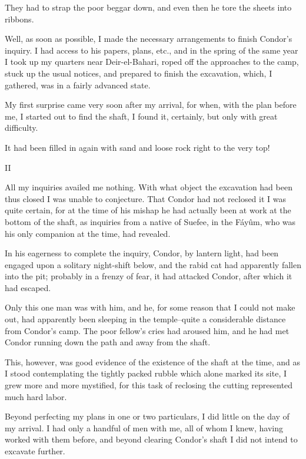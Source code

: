 They had to strap the poor beggar down, and even then he tore the
sheets into ribbons.

Well, as soon as possible, I made the necessary arrangements to finish
Condor's inquiry. I had access to his papers, plans, etc., and in the
spring of the same year I took up my quarters near Deir-el-Bahari,
roped off the approaches to the camp, stuck up the usual notices, and
prepared to finish the excavation, which, I gathered, was in a fairly
advanced state.

My first surprise came very soon after my arrival, for when, with the
plan before me, I started out to find the shaft, I found it,
certainly, but only with great difficulty.

It had been filled in again with sand and loose rock right to the very
top!


II

All my inquiries availed me nothing. With what object the excavation
had been thus closed I was unable to conjecture. That Condor had not
reclosed it I was quite certain, for at the time of his mishap he had
actually been at work at the bottom of the shaft, as inquiries from a
native of Suefee, in the Fáyûm, who was his only companion at the
time, had revealed.

In his eagerness to complete the inquiry, Condor, by lantern light,
had been engaged upon a solitary night-shift below, and the rabid cat
had apparently fallen into the pit; probably in a frenzy of fear, it
had attacked Condor, after which it had escaped.

Only this one man was with him, and he, for some reason that I could
not make out, had apparently been sleeping in the temple--quite a
considerable distance from Condor's camp. The poor fellow's cries had
aroused him, and he had met Condor running down the path and away from
the shaft.

This, however, was good evidence of the existence of the shaft at the
time, and as I stood contemplating the tightly packed rubble which
alone marked its site, I grew more and more mystified, for this task
of reclosing the cutting represented much hard labor.

Beyond perfecting my plans in one or two particulars, I did little on
the day of my arrival. I had only a handful of men with me, all of
whom I knew, having worked with them before, and beyond clearing
Condor's shaft I did not intend to excavate further.

